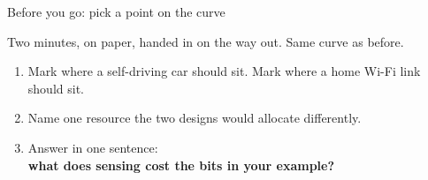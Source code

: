 \begin{frame}{Before you go: pick a point on the curve}
  \vspace{0.2em}
  {\small Two minutes, on paper, handed in on the way out. Same curve as before.\par}
  \begin{center}
  \end{center}

  \vspace{0.6em}
  \begin{enumerate}\itemsep6pt
    \item Mark where a \textcolor{ranblue}{self-driving car} should sit. Mark where a
      \textcolor{coreorange}{home Wi-Fi link} should sit.
    \item Name one resource the two designs would allocate differently.
    \item Answer in one sentence:\\
      \textbf{what does sensing cost the bits in your example?}
  \end{enumerate}
\end{frame}
